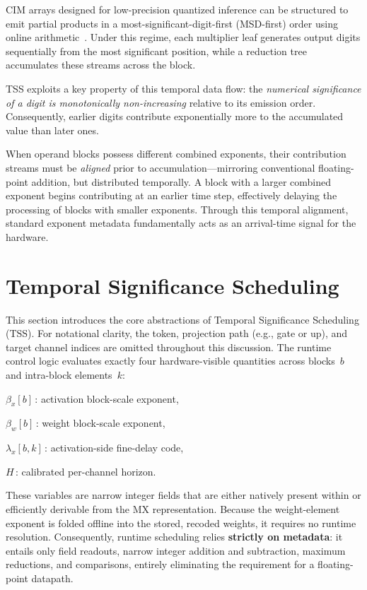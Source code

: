 \documentclass[sigconf]{acmart}
\begin{document}
CIM arrays designed for low-precision quantized inference can be structured to emit partial products in a most-significant-digit-first (MSD-first) order using online arithmetic~\cite{villalba2011radix,huang2001fpga,zhao2016efficient}. Under this regime, each multiplier leaf generates output digits sequentially from the most significant position, while a reduction tree accumulates these streams across the block. 

TSS exploits a key property of this temporal data flow: the \emph{numerical significance of a digit is monotonically non-increasing} relative to its emission order. Consequently, earlier digits contribute exponentially more to the accumulated value than later ones.

When operand blocks possess different combined exponents, their contribution streams must be \emph{aligned} prior to accumulation---mirroring conventional floating-point addition, but distributed temporally. A block with a larger combined exponent begins contributing at an earlier time step, effectively delaying the processing of blocks with smaller exponents. Through this temporal alignment, standard exponent metadata fundamentally acts as an arrival-time signal for the hardware.


\section{Temporal Significance Scheduling}
\label{sec:method}

This section introduces the core abstractions of Temporal Significance Scheduling (TSS).
For notational clarity, the token, projection path (e.g., gate or up), and target channel indices are omitted throughout this discussion. 
The runtime control logic evaluates exactly four hardware-visible quantities across blocks~$b$ and intra-block elements~$k$:
\begin{itemize*}
  \item $\beta_x[b]$\,: activation block-scale exponent,
  \item $\beta_w[b]$\,: weight block-scale exponent,
  \item $\lambda_x[b,k]$\,: activation-side fine-delay code,
  \item $H$\,: calibrated per-channel horizon.
\end{itemize*}

These variables are narrow integer fields that are either natively present within or efficiently derivable from the MX representation.
Because the weight-element exponent is folded offline into the stored, recoded weights, it requires no runtime resolution.
Consequently, runtime scheduling relies \textbf{strictly on metadata}: it entails only field readouts, narrow integer addition and subtraction, maximum reductions, and comparisons, entirely eliminating the requirement for a floating-point datapath.
\end{document}
